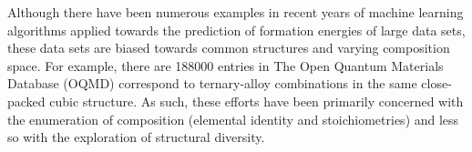%
%
Although there have been numerous examples in recent years of machine learning algorithms applied towards the prediction of formation energies of large  data sets,
these data sets are biased towards common structures and varying composition space.
%
For example, there are \mytilde\num{188000} entries in The Open Quantum Materials Database (OQMD) correspond to ternary-alloy combinations in the same close-packed cubic structure.\cite{Kirklin2015}
%
As such, these efforts have been primarily concerned with the enumeration of composition (elemental identity and stoichiometries) and less so with the exploration of structural diversity.
%
%

